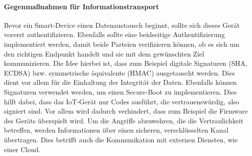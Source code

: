 \paragraph{Gegenmaßnahmen für Informationstransport}
Bevor ein Smart-Device einen Datenaustausch beginnt, sollte sich dieses
Gerät vorerst authentifizieren. Ebenfalls sollte eine beidseitige
Authentifizierung implementiert werden, damit beide Parteien verifizieren
können, ob es sich um den richtigen Endpunkt handelt und sie mit dem gewünschten
Ziel kommunizieren. Die Idee hierbei ist, dass zum Beispiel digitale Signaturen
(SHA, ECDSA) bzw. symmetrische äquivalente (HMAC) ausgetauscht werden. Dies
dient vor allem für die Einhaltung der Integrität der Daten. Ebenfalls können
Signaturen verwendet werden, um einen Secure-Boot zu implementieren. Dies hilft
dabei, dass das IoT-Gerät nur Codes ausführt, die vertrauenswürdig, also
signiert sind. Vor allem wird dadurch verhindert, dass zum Beispiel die Firmware
des Geräts überspielt wird. Um die Angriffe abzuwehren, die die Vertraulichkeit
betreffen, werden Informationen über einen sicheren, verschlüsselten Kanal
übertragen. Dies betrifft auch die Kommunikation mit externen Diensten, wie
einer Cloud.
